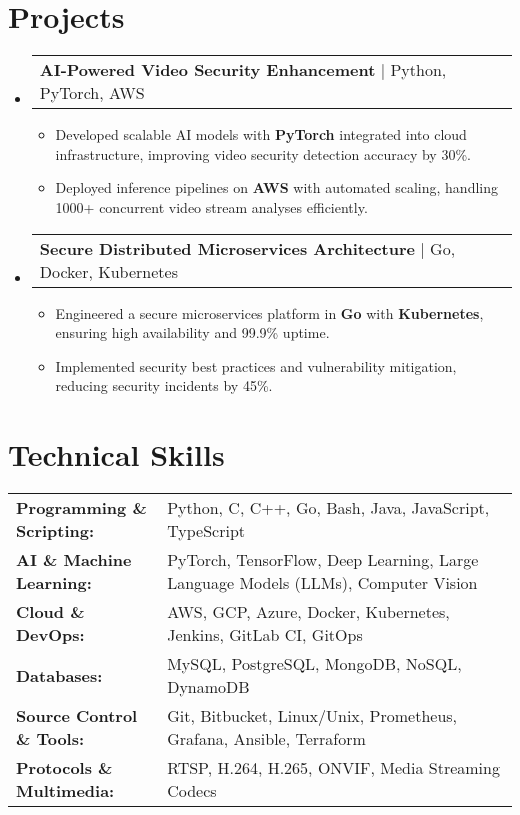 \documentclass[letterpaper,11pt]{article}
\makeatletter
\newcommand{\resumeItem}[1]{
  \item\footnotesize{
    {#1 \vspace{-2pt}}
  }
}
\newcommand{\resumeProjectHeading}[2]{
    \item
    \begin{tabular*}{1.001\textwidth}{l@{\extracolsep{\fill}}r}
      \small#1 & \textbf{\small #2}\\
    \end{tabular*}\vspace{-7pt}
}
\newcommand{\resumeSubHeadingListStart}{\begin{itemize}[leftmargin=0pt, label={}]}
\newcommand{\resumeSubHeadingListEnd}{\end{itemize}}
\newcommand{\resumeItemListStart}{\begin{itemize}[leftmargin=*]}
\newcommand{\resumeItemListEnd}{\end{itemize}\vspace{-5pt}}
\makeatother
\begin{document}
\section{Projects}
    \vspace{-5pt}
    \resumeSubHeadingListStart
      \resumeProjectHeading
          {\textbf{AI-Powered Video Security Enhancement} | Python, PyTorch, AWS}{}
          \resumeItemListStart
              \resumeItem{Developed scalable AI models with \textbf{PyTorch} integrated into cloud infrastructure, improving video security detection accuracy by 30\%.}
              \resumeItem{Deployed inference pipelines on \textbf{AWS} with automated scaling, handling 1000+ concurrent video stream analyses efficiently.}
          \resumeItemListEnd
          \vspace{-16pt}
      \resumeProjectHeading
          {\textbf{Secure Distributed Microservices Architecture} | Go, Docker, Kubernetes}{}
          \resumeItemListStart
              \resumeItem{Engineered a secure microservices platform in \textbf{Go} with \textbf{Kubernetes}, ensuring high availability and 99.9\% uptime.}
              \resumeItem{Implemented security best practices and vulnerability mitigation, reducing security incidents by 45\%.}
          \resumeItemListEnd 
    \resumeSubHeadingListEnd
\vspace{-10pt}
\section{Technical Skills}
        \vspace{-14pt}
        \begin{table}[h]
            \footnotesize
            \begin{tabular}{p{0.3\linewidth} p{0.7\linewidth}}
                \textbf{Programming \& Scripting:} & Python, C, C++, Go, Bash, Java, JavaScript, TypeScript \\
                \textbf{AI \& Machine Learning:} & PyTorch, TensorFlow, Deep Learning, Large Language Models (LLMs), Computer Vision \\
                \textbf{Cloud \& DevOps:} & AWS, GCP, Azure, Docker, Kubernetes, Jenkins, GitLab CI, GitOps \\
                \textbf{Databases:} & MySQL, PostgreSQL, MongoDB, NoSQL, DynamoDB \\
                \textbf{Source Control \& Tools:} & Git, Bitbucket, Linux/Unix, Prometheus, Grafana, Ansible, Terraform \\
                \textbf{Protocols \& Multimedia:} & RTSP, H.264, H.265, ONVIF, Media Streaming Codecs \\
            \end{tabular}
        \end{table}
\end{document}
